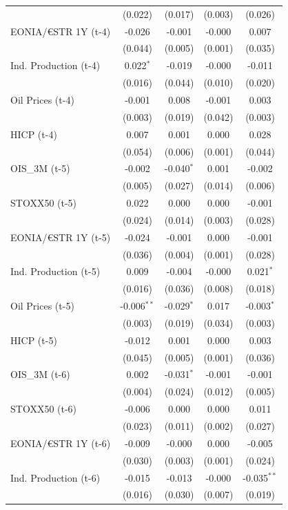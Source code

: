 \begin{longtable}[t]{lcccc}
 & (0.022) & (0.017) & (0.003) & (0.026)\\
EONIA/€STR 1Y (t-4) & -0.026 & -0.001 & -0.000 & 0.007\\
 & (0.044) & (0.005) & (0.001) & (0.035)\\
Ind. Production (t-4) & 0.022$^{*}$ & -0.019 & -0.000 & -0.011\\
 & (0.016) & (0.044) & (0.010) & (0.020)\\
Oil Prices (t-4) & -0.001 & 0.008 & -0.001 & 0.003\\
 & (0.003) & (0.019) & (0.042) & (0.003)\\
HICP (t-4) & 0.007 & 0.001 & 0.000 & 0.028\\
 & (0.054) & (0.006) & (0.001) & (0.044)\\
OIS\_3M (t-5) & -0.002 & -0.040$^{*}$ & 0.001 & -0.002\\
 & (0.005) & (0.027) & (0.014) & (0.006)\\
STOXX50 (t-5) & 0.022 & 0.000 & 0.000 & -0.001\\
 & (0.024) & (0.014) & (0.003) & (0.028)\\
EONIA/€STR 1Y (t-5) & -0.024 & -0.001 & 0.000 & -0.001\\
 & (0.036) & (0.004) & (0.001) & (0.028)\\
Ind. Production (t-5) & 0.009 & -0.004 & -0.000 & 0.021$^{*}$\\
 & (0.016) & (0.036) & (0.008) & (0.018)\\
Oil Prices (t-5) & -0.006$^{**}$ & -0.029$^{*}$ & 0.017 & -0.003$^{*}$\\
 & (0.003) & (0.019) & (0.034) & (0.003)\\
HICP (t-5) & -0.012 & 0.001 & 0.000 & 0.003\\
 & (0.045) & (0.005) & (0.001) & (0.036)\\
OIS\_3M (t-6) & 0.002 & -0.031$^{*}$ & -0.001 & -0.001\\
 & (0.004) & (0.024) & (0.012) & (0.005)\\
STOXX50 (t-6) & -0.006 & 0.000 & 0.000 & 0.011\\
 & (0.023) & (0.011) & (0.002) & (0.027)\\
EONIA/€STR 1Y (t-6) & -0.009 & -0.000 & 0.000 & -0.005\\
 & (0.030) & (0.003) & (0.001) & (0.024)\\
Ind. Production (t-6) & -0.015 & -0.013 & -0.000 & -0.035$^{**}$\\
 & (0.016) & (0.030) & (0.007) & (0.019)\\

\end{longtable}
